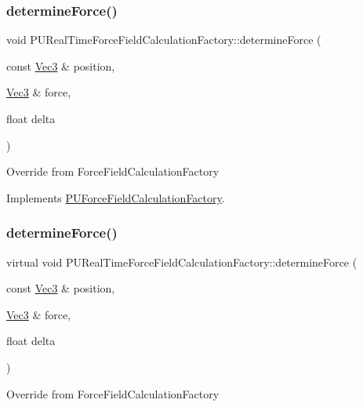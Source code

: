 \subsubsection{\texorpdfstring{determine\+Force()}{determineForce()}\hspace{0.1cm}{\footnotesize\ttfamily [1/2]}}
{\footnotesize\ttfamily void P\+U\+Real\+Time\+Force\+Field\+Calculation\+Factory\+::determine\+Force (\begin{DoxyParamCaption}\item[{const \hyperlink{classVec3}{Vec3} \&}]{position,  }\item[{\hyperlink{classVec3}{Vec3} \&}]{force,  }\item[{float}]{delta }\end{DoxyParamCaption})\hspace{0.3cm}{\ttfamily [virtual]}}

Override from Force\+Field\+Calculation\+Factory 

Implements \hyperlink{classPUForceFieldCalculationFactory_ab2ec33f744eccdd1301aa9c12a3f54f9}{P\+U\+Force\+Field\+Calculation\+Factory}.

\mbox{\label{classPURealTimeForceFieldCalculationFactory_a77c8efbd2a6dcd7e5a25ee6bd48d8f6e}} 
\subsubsection{\texorpdfstring{determine\+Force()}{determineForce()}\hspace{0.1cm}{\footnotesize\ttfamily [2/2]}}
{\footnotesize\ttfamily virtual void P\+U\+Real\+Time\+Force\+Field\+Calculation\+Factory\+::determine\+Force (\begin{DoxyParamCaption}\item[{const \hyperlink{classVec3}{Vec3} \&}]{position,  }\item[{\hyperlink{classVec3}{Vec3} \&}]{force,  }\item[{float}]{delta }\end{DoxyParamCaption})\hspace{0.3cm}{\ttfamily [virtual]}}

Override from Force\+Field\+Calculation\+Factory 

